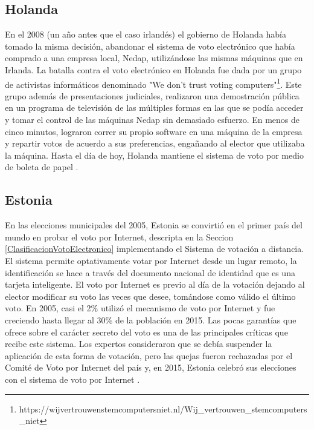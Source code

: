 \subsection{Holanda}
En el 2008 (un año antes que el caso irlandés) el gobierno de Holanda había tomado la misma decisión, abandonar el sistema de voto electrónico que había comprado a una empresa local, Nedap, utilizándose las mismas máquinas que en Irlanda. La batalla contra el voto electrónico en Holanda fue dada por un grupo de activistas informáticos denominado "We don't trust voting computers"\footnote{https://wijvertrouwenstemcomputersniet.nl/Wij\_vertrouwen\_stemcomputers\_niet}. Este grupo además de presentaciones judiciales, realizaron una demostración pública en un programa de televisión de las múltiples formas en las que se podía acceder y tomar el control de las máquinas Nedap sin demasiado esfuerzo. En menos de cinco minutos, lograron correr su propio software en una máquina de la empresa y repartir votos de acuerdo a sus preferencias, engañando al elector que utilizaba la máquina. Hasta el día de hoy, Holanda mantiene el sistema de voto por medio de boleta de papel \cite{netherlands}.

\subsection{Estonia}
En las elecciones municipales del 2005, Estonia se convirtió en el primer país del mundo en probar el voto por Internet, descripta en la Seccion \ref{ClasificacionVotoElectronico} implementando el Sistema de votación a distancia. El sistema permite optativamente votar por Internet desde un lugar remoto, la identificación se hace a través del documento nacional de identidad que es una tarjeta inteligente. El voto por Internet es previo al día de la votación dejando al elector modificar su voto las veces que desee, tomándose como válido el último voto. En 2005, casi el 2\% utilizó el mecanismo de voto por Internet y fue creciendo hasta llegar al 30\% de la población en 2015. Las pocas garantías que ofrece sobre el carácter secreto del voto es una de las principales críticas que recibe este sistema. Los expertos consideraron que se debía suspender la aplicación de esta forma de votación, pero las quejas fueron rechazadas por el Comité de Voto por Internet del país y, en 2015, Estonia celebró sus elecciones con el sistema de voto por Internet \cite{vassil2016diffusion}.

